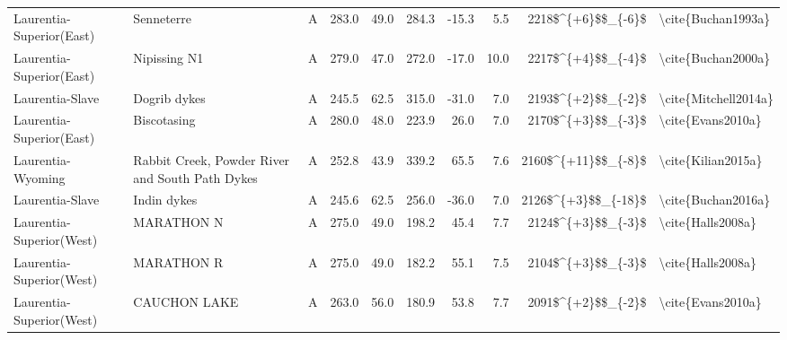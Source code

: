 \begin{longtable}{p{1 in}p{1 in}rrrrrrr}
      Laurentia-Superior(East) &                                         Senneterre &      A &     283.0 &      49.0 & 284.3 & -15.3 &       5.5 &     2218\$\textasciicircum \{+6\}\$\$\_\{-6\}\$ &                                 \textbackslash cite\{Buchan1993a\} \\
      Laurentia-Superior(East) &                                       Nipissing N1 &      A &     279.0 &      47.0 & 272.0 & -17.0 &      10.0 &     2217\$\textasciicircum \{+4\}\$\$\_\{-4\}\$ &                                 \textbackslash cite\{Buchan2000a\} \\
               Laurentia-Slave &                                       Dogrib dykes &      A &     245.5 &      62.5 & 315.0 & -31.0 &       7.0 &     2193\$\textasciicircum \{+2\}\$\$\_\{-2\}\$ &                               \textbackslash cite\{Mitchell2014a\} \\
      Laurentia-Superior(East) &                                        Biscotasing &      A &     280.0 &      48.0 & 223.9 &  26.0 &       7.0 &     2170\$\textasciicircum \{+3\}\$\$\_\{-3\}\$ &                                  \textbackslash cite\{Evans2010a\} \\
             Laurentia-Wyoming &    Rabbit Creek, Powder River and South Path Dykes &      A &     252.8 &      43.9 & 339.2 &  65.5 &       7.6 &    2160\$\textasciicircum \{+11\}\$\$\_\{-8\}\$ &                                 \textbackslash cite\{Kilian2015a\} \\
               Laurentia-Slave &                                        Indin dykes &      A &     245.6 &      62.5 & 256.0 & -36.0 &       7.0 &    2126\$\textasciicircum \{+3\}\$\$\_\{-18\}\$ &                                 \textbackslash cite\{Buchan2016a\} \\
      Laurentia-Superior(West) &                                         MARATHON N &      A &     275.0 &      49.0 & 198.2 &  45.4 &       7.7 &     2124\$\textasciicircum \{+3\}\$\$\_\{-3\}\$ &                                  \textbackslash cite\{Halls2008a\} \\
      Laurentia-Superior(West) &                                         MARATHON R &      A &     275.0 &      49.0 & 182.2 &  55.1 &       7.5 &     2104\$\textasciicircum \{+3\}\$\$\_\{-3\}\$ &                                  \textbackslash cite\{Halls2008a\} \\
      Laurentia-Superior(West) &                                       CAUCHON LAKE &      A &     263.0 &      56.0 & 180.9 &  53.8 &       7.7 &     2091\$\textasciicircum \{+2\}\$\$\_\{-2\}\$ &                                  \textbackslash cite\{Evans2010a\} \\

\end{longtable}
